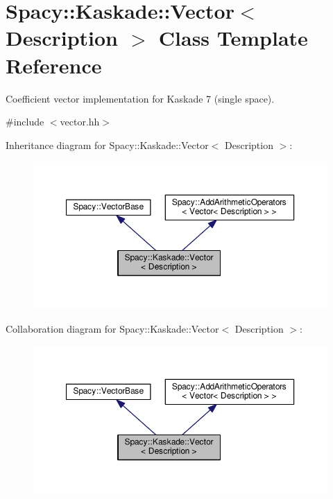 \hypertarget{classSpacy_1_1Kaskade_1_1Vector}{}\section{Spacy\+:\+:Kaskade\+:\+:Vector$<$ Description $>$ Class Template Reference}
\label{classSpacy_1_1Kaskade_1_1Vector}


Coefficient vector implementation for Kaskade 7 (single space).  




{\ttfamily \#include $<$vector.\+hh$>$}



Inheritance diagram for Spacy\+:\+:Kaskade\+:\+:Vector$<$ Description $>$\+:\nopagebreak
\begin{figure}[H]
\begin{center}
\leavevmode
\includegraphics[width=350pt]{classSpacy_1_1Kaskade_1_1Vector__inherit__graph}
\end{center}
\end{figure}


Collaboration diagram for Spacy\+:\+:Kaskade\+:\+:Vector$<$ Description $>$\+:\nopagebreak
\begin{figure}[H]
\begin{center}
\leavevmode
\includegraphics[width=350pt]{classSpacy_1_1Kaskade_1_1Vector__coll__graph}
\end{center}
\end{figure}
